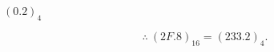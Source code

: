 \begin{minipage}{\linewidth}
\begin{minipage}[t]{.48\linewidth}
$ (0.2)_{4} $
\end{minipage}\par
\[\therefore\ (2F.8)_{16}=(233.2)_{4}.\]
\end{minipage}\par
